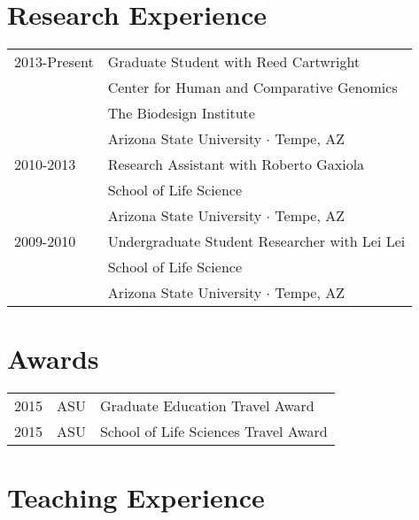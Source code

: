 \documentclass[11pt]{article}
\begin{document}
\section*{Research Experience}
\begin{tabularx}{\linewidth}{lX}
2013-Present&Graduate Student with Reed Cartwright\\
&Center for Human and Comparative Genomics\\
&The Biodesign Institute\\
&Arizona State University $\cdotp$ Tempe, AZ\\
2010-2013&Research Assistant with Roberto Gaxiola\\
&School of Life Science\\
&Arizona State University $\cdotp$ Tempe, AZ\\
2009-2010&Undergraduate Student Researcher with Lei Lei\\
&School of Life Science\\
&Arizona State University $\cdotp$ Tempe, AZ\\
\end{tabularx}

\section*{Awards}
\begin{tabularx}{\linewidth}{llX}
2015 & ASU &Graduate Education Travel Award\\
2015 & ASU &School of Life Sciences Travel Award\\
\end{tabularx}

\newpage
\section*{Teaching Experience}
\end{document}
